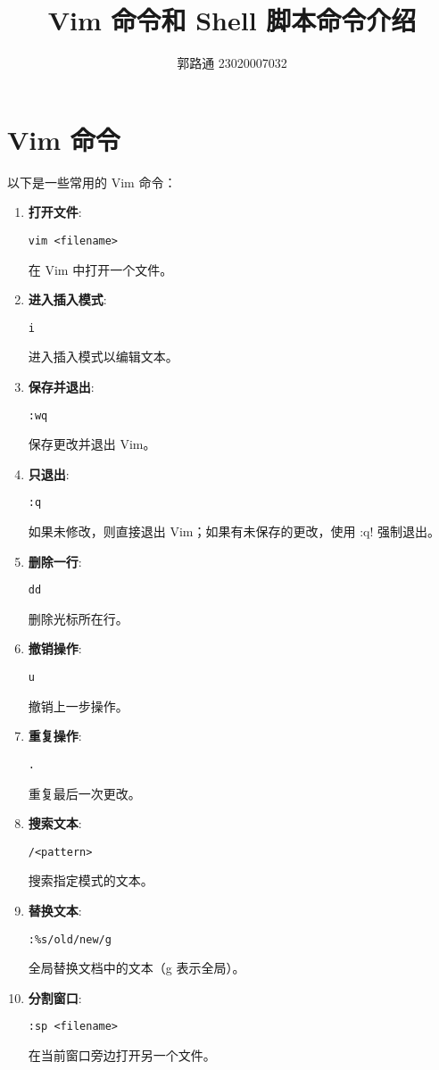 \documentclass{ctexart}
\begin{document}
\title{Vim 命令和 Shell 脚本命令介绍}
\author{郭路通  23020007032}
\date{}
\maketitle

\section{Vim 命令}
以下是一些常用的 Vim 命令：

\begin{enumerate}[label=\arabic*.]
\item \textbf{打开文件}:
\begin{lstlisting}
vim <filename>
\end{lstlisting}
在 Vim 中打开一个文件。

\item \textbf{进入插入模式}:
\begin{lstlisting}
i
\end{lstlisting}
进入插入模式以编辑文本。

\item \textbf{保存并退出}:
\begin{lstlisting}
:wq
\end{lstlisting}
保存更改并退出 Vim。

\item \textbf{只退出}:
\begin{lstlisting}
:q
\end{lstlisting}
如果未修改，则直接退出 Vim；如果有未保存的更改，使用 :q! 强制退出。

\item \textbf{删除一行}:
\begin{lstlisting}
dd
\end{lstlisting}
删除光标所在行。

\item \textbf{撤销操作}:
\begin{lstlisting}
u
\end{lstlisting}
撤销上一步操作。

\item \textbf{重复操作}:
\begin{lstlisting}
.
\end{lstlisting}
重复最后一次更改。

\item \textbf{搜索文本}:
\begin{lstlisting}
/<pattern>
\end{lstlisting}
搜索指定模式的文本。

\item \textbf{替换文本}:
\begin{lstlisting}
:%s/old/new/g
\end{lstlisting}
全局替换文档中的文本（g 表示全局）。

\item \textbf{分割窗口}:
\begin{lstlisting}
:sp <filename>
\end{lstlisting}
在当前窗口旁边打开另一个文件。
\end{enumerate}
\end{document}
